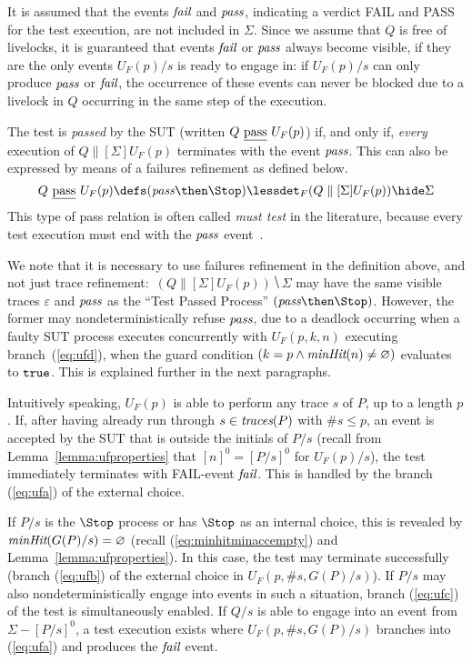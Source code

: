 It is assumed that the events ${\text{\it fail}}$ and ${\text{\it pass}}$, indicating a verdict
FAIL and PASS for the test execution, are not included in $\Sigma$. Since we
assume that $Q$ is free of livelocks, it is guaranteed that events ${\text{\it fail}}$
or ${\text{\it pass}}$ always become visible, if they are the only events $U_F(p)/s$ is
ready to engage in: if $U_F(p)/s$ can only produce ${\text{\it pass}}$ or ${\text{\it fail}}$, the
occurrence of these events can never be blocked due to a livelock in $Q$
occurring in the same step of the execution.


The test is \emph{passed} by the SUT (written $Q\ \underline{\text{pass}}\ U_F(p)$) if, and
only if, {\it every} execution of $Q\parallel[\Sigma] U_F(p)$ terminates with
the event ${\text{\it pass}}$. This can also be  expressed by means of a failures
refinement as defined below.
%
\begin{equation}
\label{eq:passF}
Q\ \pass\ U_F(p) \defs (\epass\then\Stop) \lessdet_F (Q\parallel[\Sigma] U_F(p)) \hide \Sigma
\end{equation}
%
This type of pass relation is often called \emph{must test} in the
literature, because every test execution must end with the ${\text{\it pass}}$
event~\cite{Hennessy:1988:ATP:50497}.

We note that it is necessary to use failures refinement in the definition
above, and not just trace refinement:~$(Q\parallel[\Sigma] U_F(p)) \hide
\Sigma$ may have the same visible traces $\varepsilon$ and ${\text{\it pass}}$ as the
``Test Passed Process'' $(\epass\then\Stop)$. However, the former may
nondeterministically refuse ${\text{\it pass}}$, due to a deadlock occurring when a
faulty SUT process executes concurrently with $U_F(p,k,n)$ executing
branch~(\ref{eq:ufd}), when the guard condition $(k = p\wedge
\text{\it minHit}(n)\neq\varnothing)$ evaluates to $\mbox{{\tt true}}$. This is explained further
in the next paragraphs.

Intuitively speaking, $U_F(p)$ is able to perform any trace $s$ of $P$, up to
a length $p$. If, after having already run through $s\in\text{\it traces}(P)$ with $\#s
\le p$, an event is accepted by the SUT that is outside the initials of $P/s$
 (recall from Lemma~\ref{lemma:ufproperties} that $[n]^0 = [P/s]^0$ for $U_F(p)/s$),
the test immediately terminates with FAIL-event ${\text{\it fail}}$. This is handled by
the branch (\ref{eq:ufa}) of the external choice. %

If $P/s$ is the $\Stop$ process or has $\Stop$ as an internal choice, this is
revealed by $\text{\it minHit}(G(P)/s) = \varnothing$ (recall
(\ref{eq:minhitminaccempty}) and Lemma~\ref{lemma:ufproperties}). In this
case, the test may terminate successfully (branch (\ref{eq:ufb}) of the
external choice in $U_F(p,\#s,G(P)/s)$). If $P/s$ may also
nondeterministically engage into events in such a situation, branch
(\ref{eq:ufc}) of the test is simultaneously enabled. If $Q/s$ is able to
engage into an event from $\Sigma - [P/s]^0$, a test execution exists where
$U_F(p,\#s,G(P)/s)$ branches into (\ref{eq:ufa}) and produces the ${\text{\it fail}}$
event.

